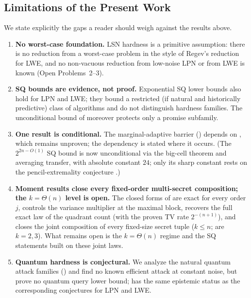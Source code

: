\documentclass[11pt,a4paper]{article}
\theoremstyle{plain}
\theoremstyle{definition}
\begin{document}
\subsection{Limitations of the Present Work}
\label{subsec:limitations}

We state explicitly the gaps a reader should weigh against the results above.

\begin{enumerate}
\item \textbf{No worst-case foundation.} LSN hardness is a primitive assumption: there is no reduction from a worst-case problem in the style of Regev's reduction for LWE, and no non-vacuous reduction from low-noise LPN or from LWE is known (Open Problems~2--3).

\item \textbf{SQ bounds are evidence, not proof.} Exponential SQ lower bounds also hold for LPN and LWE; they bound a restricted (if natural and historically predictive) class of algorithms and do not distinguish hardness families. The unconditional bound of  moreover protects only a promise subfamily.

\item \textbf{One result is conditional.} The marginal-adaptive barrier () depends on , which remains unproven; the dependency is stated where it occurs. (The $2^{2n-O(1)}$ SQ bound is now unconditional via the big-cell theorem and averaging transfer, with absolute constant $24$; only its sharp constant rests on the pencil-extremality conjecture .)

\item \textbf{Moment results close every fixed-order multi-secret composition; the $k=\Theta(n)$ level is open.} The closed forms of  are exact for every order $j$,  controls the variance multiplier at the maximal block,  recovers the full exact law of the quadrant count (with the proven TV rate $2^{-(n+1)}$), and  closes the joint composition of every fixed-size secret tuple ($k \le n$;  are $k=2,3$). What remains open is the $k=\Theta(n)$ regime and the SQ statements built on these joint laws.

\item \textbf{Quantum hardness is conjectural.} We analyze the natural quantum attack families () and find no known efficient attack at constant noise, but prove no quantum query lower bound;  has the same epistemic status as the corresponding conjectures for LPN and LWE.
\end{enumerate}
\end{document}
